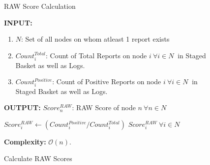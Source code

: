 \documentclass[journal]{IEEEtran}
\makeatletter
\newcommand{\removelatexerror}{\let\@latex@error\@gobble}
\makeatother
\begin{document}
\begin{figure}[!t]\removelatexerror
	\caption{RAW Score Calculation} 
	\label{fig:ALG_rawSCalc}
\begin{algorithm}[H]
	\caption{Calculate RAW Scores}  
	\label{algo:rawSCalc} 
	\textbf{INPUT:} 
	\begin{enumerate}
		\item $N$: Set of all nodes on whom atleast 1 report exists
		\item $Count^{Total}_{i}$: Count of Total Reports on node $ i\ \forall i\in N\ $ in Staged Basket as well as Logs.
		\item $Count^{Positive}_{i}$: Count of Positive Reports on node $ i\ \forall i\in N\ $ in Staged Basket as well as Logs.
	\end{enumerate}
	\textbf{OUTPUT:}  $Score^{RAW}_n$: RAW Score of node $n\ \forall n\in N$
	\begin{algorithmic}[1]
		\STATE $ Score^{RAW}_i \leftarrow ({Count^{Positive}_i}/{Count^{Total}_i}) $
		\ENDFOR
		\RETURN $Score^{RAW}_i\ \forall i\in N$
	\end{algorithmic}
	\textbf{Complexity:} $\mathcal{O}(n)$.
\end{algorithm}
\end{figure}
\end{document}

